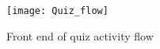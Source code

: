 \begin{figure}[!t]
\begin{center}
\texttt{[image: Quiz\_flow]}
\end{center}
\centering
\captionsetup{justification=centering}
\caption{Front end of quiz activity flow}
\label{fig:quiz_flow}
\end{figure}


